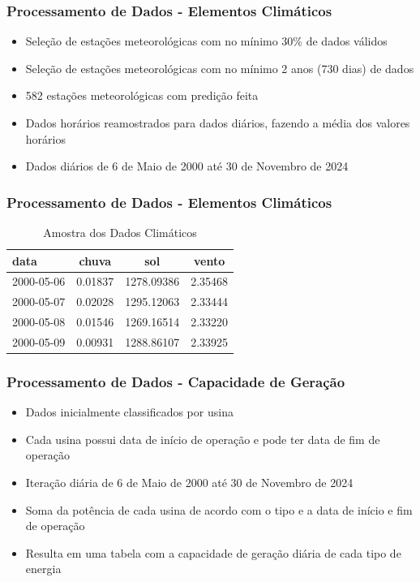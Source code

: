 \documentclass{beamer}
\begin{document}
\begin{frame}
\frametitle{Processamento de Dados - Elementos Climáticos}
\begin{itemize}
    \item Seleção de estações meteorológicas com no mínimo 30\% de dados válidos
    \item Seleção de estações meteorológicas com no mínimo 2 anos (730 dias) de dados
    \item 582 estações meteorológicas com predição feita
    \item Dados horários reamostrados para dados diários, fazendo a média dos valores horários
    \item Dados diários de 6 de Maio de 2000 até 30 de Novembro de 2024
\end{itemize}
\end{frame}


\begin{frame}
\frametitle{Processamento de Dados - Elementos Climáticos}
\begin{table}[ht]
    \centering
    \begin{tabular}{l c c c}
        \hline
        data & chuva & sol & vento \\
        \hline
        2000-05-06 & 0.01837 & 1278.09386 & 2.35468 \\
        2000-05-07 & 0.02028 & 1295.12063 & 2.33444 \\
        2000-05-08 & 0.01546 & 1269.16514 & 2.33220 \\
        2000-05-09 & 0.00931 & 1288.86107 & 2.33925 \\
        \hline
    \end{tabular}
    \caption{Amostra dos Dados Climáticos}
\end{table}
\end{frame}


\begin{frame}
\frametitle{Processamento de Dados - Capacidade de Geração}
\begin{itemize}
    \item Dados inicialmente classificados por usina
    \item Cada usina possui data de início de operação e pode ter data de fim de operação
    \item Iteração diária de 6 de Maio de 2000 até 30 de Novembro de 2024
    \item Soma da potência de cada usina de acordo com o tipo e a data de início e fim de operação
    \item Resulta em uma tabela com a capacidade de geração diária de cada tipo de energia
\end{itemize}
\end{frame}
\end{document}
